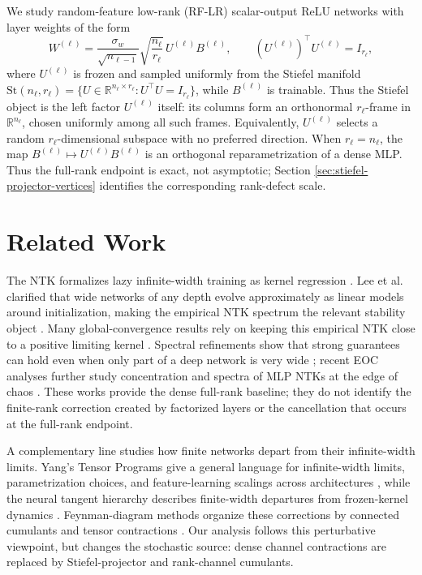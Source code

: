 \documentclass{article}
\newcommand{\R}{\mathbb R}
\begin{document}
We study random-feature low-rank (RF-LR) scalar-output ReLU networks with layer weights of the form
\begin{equation}
W^{(\ell)}=\frac{\sigma_w}{\sqrt{n_{\ell-1}}}\sqrt{\frac{n_\ell}{r_\ell}}\,U^{(\ell)}B^{(\ell)},
\qquad (U^{(\ell)})^\top U^{(\ell)}=I_{r_\ell},
\label{eq:intro-model}
\end{equation}
where \(U^{(\ell)}\) is frozen and sampled uniformly from the Stiefel manifold
\(\mathrm{St}(n_\ell,r_\ell)=\{U\in\R^{n_\ell\times r_\ell}:U^\top U=I_{r_\ell}\}\), while \(B^{(\ell)}\) is trainable. Thus the Stiefel object is the left factor \(U^{(\ell)}\) itself: its columns form an orthonormal \(r_\ell\)-frame in \(\R^{n_\ell}\), chosen uniformly among all such frames. Equivalently, \(U^{(\ell)}\) selects a random \(r_\ell\)-dimensional subspace with no preferred direction. When \(r_\ell=n_\ell\), the map \(B^{(\ell)}\mapsto U^{(\ell)}B^{(\ell)}\) is an orthogonal reparametrization of a dense MLP. Thus the full-rank endpoint is exact, not asymptotic; Section \ref{sec:stiefel-projector-vertices} identifies the corresponding rank-defect scale.

\section{Related Work}
The NTK formalizes lazy infinite-width training as kernel regression \citep{Jacot2018,Lee2019}. Lee et al. clarified that wide networks of any depth evolve approximately as linear models around initialization, making the empirical NTK spectrum the relevant stability object \citep{Lee2019}. Many global-convergence results rely on keeping this empirical NTK close to a positive limiting kernel \citep{Du2019,AllenZhu2019,Arora2019}. Spectral refinements show that strong guarantees can hold even when only part of a deep network is very wide \citep{NguyenMondelli2020,NguyenMondelliMontufar2022}; recent EOC analyses further study concentration and spectra of MLP NTKs at the edge of chaos \citep{TerjekGonzalezSanchez2025Concentration,TerjekGonzalezSanchez2025Spectrum}. These works provide the dense full-rank baseline; they do not identify the finite-rank correction created by factorized layers or the cancellation that occurs at the full-rank endpoint.

A complementary line studies how finite networks depart from their infinite-width limits. Yang's Tensor Programs give a general language for infinite-width limits, parametrization choices, and feature-learning scalings across architectures \citep{Yang2019,Yang2021,Yang2022MuP,YangDepthMuP2024}, while the neural tangent hierarchy describes finite-width departures from frozen-kernel dynamics \citep{Huang2020}. Feynman-diagram methods organize these corrections by connected cumulants and tensor contractions \citep{DyerGurAri2019,FeynmanNTK2025}. Our analysis follows this perturbative viewpoint, but changes the stochastic source: dense channel contractions are replaced by Stiefel-projector and rank-channel cumulants.
\end{document}
